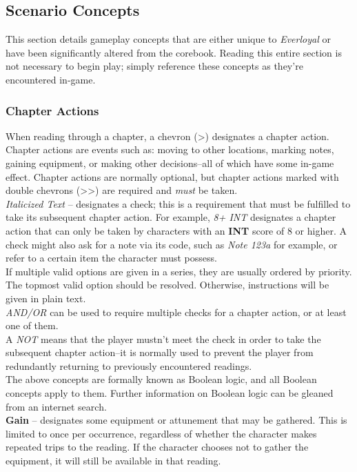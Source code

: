 \documentclass[12pt]{article}
\begin{document}
\begin{multicols*}{2}
\subsection{Scenario Concepts}
This section details gameplay concepts that are either unique to \emph{Everloyal} or have been significantly altered from the corebook. Reading this entire section is not necessary to begin play; simply reference these concepts as they’re encountered in-game.

\subsubsection{Chapter Actions}
When reading through a chapter, a chevron (>) designates a chapter action. Chapter actions are events such as: moving to other locations, marking notes, gaining equipment, or making other decisions--all of which have some in-game effect. Chapter actions are normally optional, but chapter actions marked with double chevrons (>>) are required and \emph{must} be taken.\\

\emph{Italicized Text} -- designates a check; this is a requirement that must be fulfilled to take its subsequent chapter action. For example, \emph{8+ INT} designates a chapter action that can only be taken by characters with an \textbf{INT} score of 8 or higher. A check might also ask for a note via its code, such as \emph{Note 123a} for example, or refer to a certain item the character must possess.\\
If multiple valid options are given in a series, they are usually ordered by priority. The topmost valid option should be resolved. Otherwise, instructions will be given in plain text.\\
\emph{AND/OR} can be used to require multiple checks for a chapter action, or at least one of them.\\
A \emph{NOT} means that the player mustn’t meet the check in order to take the subsequent chapter action--it is normally used to prevent the player from redundantly returning to previously encountered readings.\\
The above concepts are formally known as Boolean logic, and all Boolean concepts apply to them. Further information on Boolean logic can be gleaned from an internet search.\\

\textbf{Gain} -- designates some equipment or attunement that may be gathered. This is limited to once per occurrence, regardless of whether the character makes repeated trips to the reading. If the character chooses not to gather the equipment, it will still be available in that reading.\\


\end{multicols*}
\end{document}
